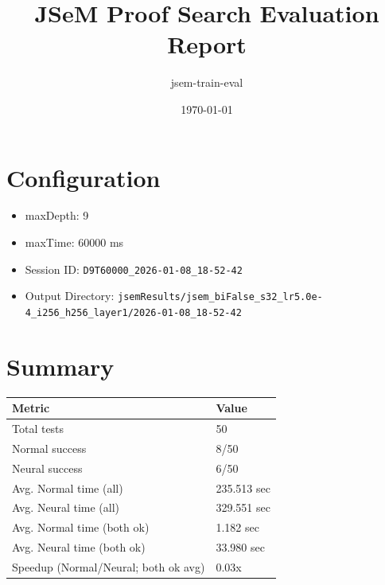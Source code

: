\documentclass[a4paper,10pt]{article}
\title{JSeM Proof Search Evaluation Report}
\author{jsem-train-eval}
\date{\today}
\begin{document}
\maketitle

\section{Configuration}
\begin{itemize}
\item maxDepth: 9
\item maxTime: 60000 ms
\item Session ID: \texttt{D9T60000\_2026-01-08\_18-52-42}
\item Output Directory: \texttt{jsemResults/jsem\_biFalse\_s32\_lr5.0e-4\_i256\_h256\_layer1/2026-01-08\_18-52-42}
\end{itemize}

\section{Summary}
\begin{tabular}{ll}
\toprule
\textbf{Metric} & \textbf{Value} \\
\midrule
Total tests & 50 \\
Normal success & 8/50 \\
Neural success & 6/50 \\
\midrule
Avg. Normal time (all) & 235.513 sec \\
Avg. Neural time (all) & 329.551 sec \\
Avg. Normal time (both ok) & 1.182 sec \\
Avg. Neural time (both ok) & 33.980 sec \\
Speedup (Normal/Neural; both ok avg) & 0.03x \\
\bottomrule
\end{tabular}
\end{document}
